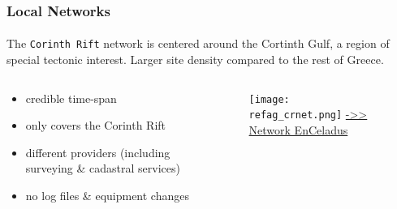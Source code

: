 \begin{frame}\frametitle{Local Networks}\framesubtitle{}
\vskip-1cm
  The \texttt{Corinth Rift} network is centered around the Cortinth Gulf, a 
  region of special tectonic interest. Larger site density compared to the 
  rest of Greece.
  \begin{columns}[T]
    \begin{column}{.4\textwidth}
      \begin{itemize}
        \item<pro@1-> credible time-span
        \item<pro@1-> only covers the Corinth Rift
        \item<con@1-> different providers (including surveying \& cadastral services)
        \item<con@1-> no log files \& equipment changes
      \end{itemize}
    \end{column}
    \begin{column}{.6\textwidth}
      \begin{figure}
      \begin{center}
        \texttt{[image: refag\_crnet.png]}
      \href{http://dionysos.survey.ntua.gr/dso/enceladus/}{->> Network EnCeladus}
     \label{fig:crlab}
     \end{center}
 \end{figure}
      
    \end{column}
  \end{columns}
\end{frame}

